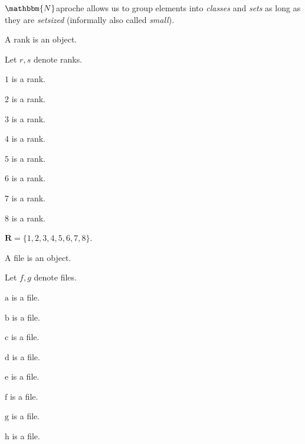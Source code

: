\documentclass{article}
\newcommand{\Rank}{\mathbf{R}} %
\newcommand{\fileA}{\mathrm{a}}
\newcommand{\fileB}{\mathrm{b}}
\newcommand{\fileC}{\mathrm{c}}
\newcommand{\fileD}{\mathrm{d}}
\newcommand{\fileE}{\mathrm{e}}
\newcommand{\fileF}{\mathrm{f}}
\newcommand{\fileG}{\mathrm{g}}
\newcommand{\fileH}{\mathrm{h}}
\newcommand{\Naproche}{$\mathbbm{N}$aproche}
\begin{document}
\Naproche{} allows us to group elements into \textit{classes} and \textit{sets} as long as they are \textit{setsized} (informally also called \textit{small}).
\begin{forthel}
    \begin{signature} A rank is an object. \end{signature}
    Let $r, s$ denote ranks.

    \begin{signature} $1$ is a rank. \end{signature}
    \begin{signature} $2$ is a rank. \end{signature}
    \begin{signature} $3$ is a rank. \end{signature}
    \begin{signature} $4$ is a rank. \end{signature}
    \begin{signature} $5$ is a rank. \end{signature}
    \begin{signature} $6$ is a rank. \end{signature}
    \begin{signature} $7$ is a rank. \end{signature}
    \begin{signature} $8$ is a rank. \end{signature}

    \begin{definition} $\Rank = \{1,2,3,4,5,6,7,8\}$. \end{definition}

    \begin{signature} A file is an object. \end{signature}
    Let $f, g$ denote files.

    \begin{signature} $\fileA$ is a file. \end{signature}
    \begin{signature} $\fileB$ is a file. \end{signature}
    \begin{signature} $\fileC$ is a file. \end{signature}
    \begin{signature} $\fileD$ is a file. \end{signature}
    \begin{signature} $\fileE$ is a file. \end{signature}
    \begin{signature} $\fileF$ is a file. \end{signature}
    \begin{signature} $\fileG$ is a file. \end{signature}
    \begin{signature} $\fileH$ is a file. \end{signature}


\end{forthel}
\end{document}
